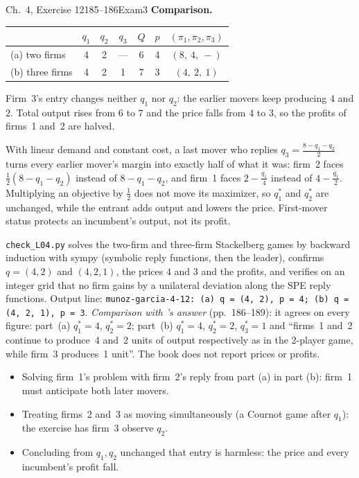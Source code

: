 \begin{exsol}{\MG{} Ch.~4, Exercise 12}{185--186}{Exam}{3}
\textbf{Comparison.}
\begin{center}
\begin{tabular}{lcccccc}
\toprule
 & $q_1$ & $q_2$ & $q_3$ & $Q$ & $p$ & $(\pi_1,\pi_2,\pi_3)$ \\
\midrule
(a) two firms & 4 & 2 & --- & 6 & 4 & $(8,\ 4,\ -)$ \\
(b) three firms & 4 & 2 & 1 & 7 & 3 & $(4,\ 2,\ 1)$ \\
\bottomrule
\end{tabular}
\end{center}
Firm~3's entry changes neither $q_1$ nor $q_2$: the earlier movers keep producing $4$ and $2$. Total output
rises from $6$ to $7$ and the price falls from $4$ to $3$, so the profits of firms~1 and~2 are halved.

\interp With linear demand and constant cost, a last mover who replies $q_3 = \frac{8-q_1-q_2}{2}$ turns every
earlier mover's margin into exactly half of what it was: firm~2 faces $\frac12(8-q_1-q_2)$ instead of $8-q_1-q_2$, and
firm~1 faces $2 - \frac{q_1}{4}$ instead of $4 - \frac{q_1}{2}$. Multiplying an objective by $\frac12$ does not move its
maximizer, so $q_1^*$ and $q_2^*$ are unchanged, while the entrant adds output and lowers the price. First-mover
status protects an incumbent's output, not its profit.

\verify \texttt{check\_L04.py} solves the two-firm and three-firm Stackelberg games by backward induction with
sympy (symbolic reply functions, then the leader), confirms $q = (4,2)$ and $(4,2,1)$, the prices $4$ and $3$ and the
profits, and verifies on an integer grid that no firm gains by a unilateral deviation along the SPE reply
functions. Output line: \texttt{munoz-garcia-4-12: (a) q = (4, 2), p = 4; (b) q = (4, 2, 1), p = 3}.
\emph{Comparison with \MG{}'s answer} (pp.~186--189): it agrees on every figure: part~(a) $q_1^* = 4$,
$q_2^* = 2$; part~(b) $q_1^* = 4$, $q_2^* = 2$, $q_3^* = 1$ and ``firms~1 and~2 continue to produce~4 and~2
units of output respectively as in the 2-player game, while firm~3 produces~1 unit''. The book does not
report prices or profits.

\mistakes
\begin{itemize}
  \item Solving firm~1's problem with firm~2's reply from part (a) in part (b): firm~1 must anticipate both
  later movers.
  \item Treating firms~2 and~3 as moving simultaneously (a Cournot game after $q_1$): the exercise has firm~3
  observe $q_2$.
  \item Concluding from $q_1, q_2$ unchanged that entry is harmless: the price and every incumbent's
  profit fall.
\end{itemize}

\end{exsol}
